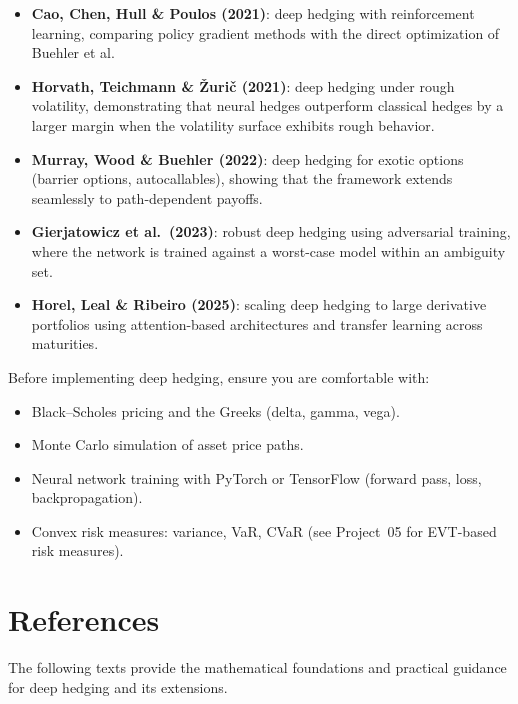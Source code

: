 \documentclass[11pt, a4paper]{article}
\theoremstyle{definition}
\theoremstyle{plain}
\theoremstyle{remark}
\begin{document}
\begin{itemize}
    \item \textbf{Cao, Chen, Hull \& Poulos (2021)}: deep hedging with reinforcement learning,
          comparing policy gradient methods with the direct optimization of Buehler et al.
    \item \textbf{Horvath, Teichmann \& \v{Z}uri\v{c} (2021)}: deep hedging under rough volatility,
          demonstrating that neural hedges outperform classical hedges by a larger margin
          when the volatility surface exhibits rough behavior.
    \item \textbf{Murray, Wood \& Buehler (2022)}: deep hedging for exotic options
          (barrier options, autocallables), showing that the framework extends seamlessly
          to path-dependent payoffs.
    \item \textbf{Gierjatowicz et al.\ (2023)}: robust deep hedging using adversarial training,
          where the network is trained against a worst-case model within an ambiguity set.
    \item \textbf{Horel, Leal \& Ribeiro (2025)}: scaling deep hedging to large derivative portfolios
          using attention-based architectures and transfer learning across maturities.
\end{itemize}

\begin{prereq}
Before implementing deep hedging, ensure you are comfortable with:
\begin{itemize}
    \item Black--Scholes pricing and the Greeks (delta, gamma, vega).
    \item Monte Carlo simulation of asset price paths.
    \item Neural network training with PyTorch or TensorFlow (forward pass, loss, backpropagation).
    \item Convex risk measures: variance, VaR, CVaR (see Project~05 for EVT-based risk measures).
\end{itemize}
\end{prereq}

\section{References}
\label{sec:references}

The following texts provide the mathematical foundations and practical guidance
for deep hedging and its extensions.
\end{document}
